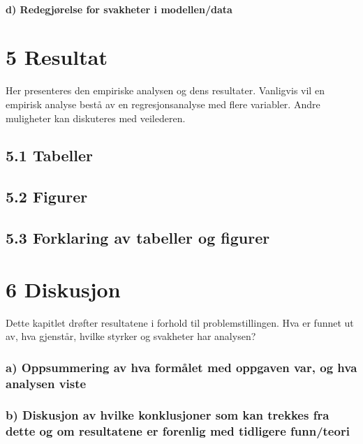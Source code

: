 \documentclass[
  12pt,
  a4paper,
  DIV=11,
  numbers=noendperiod]{scrartcl}
\let\oldparagraph\paragraph
\renewcommand{\paragraph}[1]{\oldparagraph{#1}\mbox{}}
\begin{document}
\paragraph{d) Redegjørelse for svakheter i
modellen/data}\label{d-redegjuxf8relse-for-svakheter-i-modellendata}

\newpage

\section{5 Resultat}\label{resultat}

Her presenteres den empiriske analysen og dens resultater. Vanligvis vil
en empirisk analyse bestå av en regresjonsanalyse med flere variabler.
Andre muligheter kan diskuteres med veilederen.

\subsection{5.1 Tabeller}\label{tabeller}

\subsection{5.2 Figurer}\label{figurer}

\subsection{5.3 Forklaring av tabeller og
figurer}\label{forklaring-av-tabeller-og-figurer}

\newpage

\section{6 Diskusjon}\label{diskusjon}

Dette kapitlet drøfter resultatene i forhold til problemstillingen. Hva
er funnet ut av, hva gjenstår, hvilke styrker og svakheter har analysen?

\subsubsection{a) Oppsummering av hva formålet med oppgaven var, og hva
analysen
viste}\label{a-oppsummering-av-hva-formuxe5let-med-oppgaven-var-og-hva-analysen-viste}

\subsubsection{b) Diskusjon av hvilke konklusjoner som kan trekkes fra
dette og om resultatene er forenlig med tidligere
funn/teori}\label{b-diskusjon-av-hvilke-konklusjoner-som-kan-trekkes-fra-dette-og-om-resultatene-er-forenlig-med-tidligere-funnteori}
\end{document}
